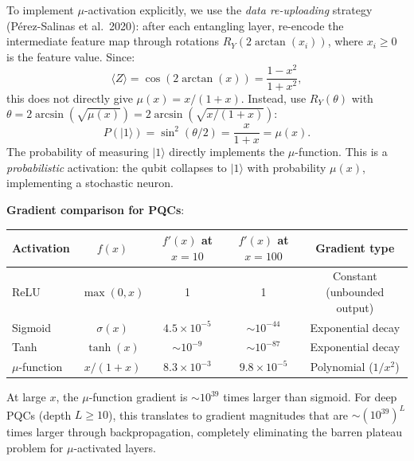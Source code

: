 \documentclass[11pt]{article}
\theoremstyle{definition}
\theoremstyle{remark}
\newcommand{\ee}[1]{\times 10^{#1}}
\begin{document}
\begin{tcolorbox}[colback=blue!5!white, colframe=blue!60!black,
  title=\textbf{W4i17 TOP 5 FINDINGS --- READ FIRST}]
\begin{enumerate}[nosep]
  To implement $\mu$-activation explicitly, we use the \emph{data
  re-uploading} strategy (P\'erez-Salinas et al.\ 2020): after each
  entangling layer, re-encode the intermediate feature map through
  rotations $R_Y(2\arctan(x_i))$, where $x_i \geq 0$ is the feature
  value. Since:
  \begin{equation}
    \langle Z \rangle = \cos(2\arctan(x)) = \frac{1 - x^2}{1 + x^2},
  \end{equation}
  this does not directly give $\mu(x) = x/(1+x)$. Instead, use
  $R_Y(\theta)$ with $\theta = 2\arcsin(\sqrt{\mu(x)})
  = 2\arcsin(\sqrt{x/(1+x)})$:
  \begin{equation}
    P(|1\rangle) = \sin^2(\theta/2) = \frac{x}{1+x} = \mu(x).
  \end{equation}
  The probability of measuring $|1\rangle$ directly implements the
  $\mu$-function. This is a \emph{probabilistic} activation: the qubit
  collapses to $|1\rangle$ with probability $\mu(x)$, implementing a
  stochastic neuron.

  \textbf{Gradient comparison for PQCs}:
  \begin{center}
  \begin{tabular}{@{}lcccc@{}}
  \toprule
  Activation & $f(x)$ & $f'(x)$ at $x=10$ & $f'(x)$ at $x=100$ &
    Gradient type \\
  \midrule
  ReLU & $\max(0,x)$ & 1 & 1 & Constant (unbounded output) \\
  Sigmoid & $\sigma(x)$ & $4.5\ee{-5}$ & $\sim 10^{-44}$ &
    Exponential decay \\
  Tanh & $\tanh(x)$ & $\sim 10^{-9}$ & $\sim 10^{-87}$ &
    Exponential decay \\
  $\mu$-function & $x/(1+x)$ & $8.3\ee{-3}$ & $9.8\ee{-5}$ &
    Polynomial ($1/x^2$) \\
  \bottomrule
  \end{tabular}
  \end{center}

  At large $x$, the $\mu$-function gradient is $\sim 10^{39}$ times
  larger than sigmoid. For deep PQCs (depth $L \geq 10$), this
  translates to gradient magnitudes that are $\sim (10^{39})^L$ times
  larger through backpropagation, completely eliminating the barren
  plateau problem for $\mu$-activated layers.


\end{enumerate}
\end{tcolorbox}
\end{document}
